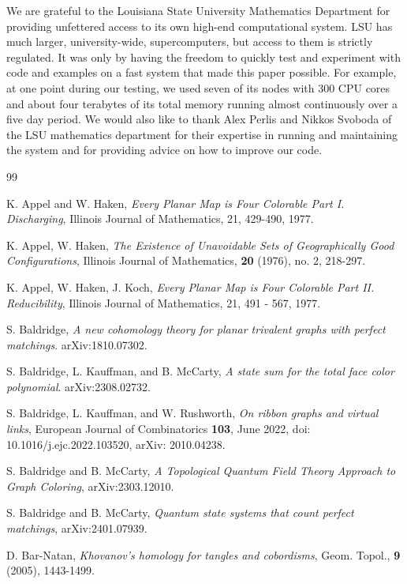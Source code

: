 \documentclass[12pt]{amsart}
\theoremstyle{definition}
\theoremstyle{remark}
\numberwithin{equation}{section}
\begin{document}
We are grateful to the Louisiana State University Mathematics Department for providing unfettered access to its own high-end computational system. LSU has much larger, university-wide, supercomputers, but access to them is strictly regulated. It was only by having the freedom to quickly test and experiment with code and examples on a fast system that made this paper possible. For example, at one point during our testing, we used seven of its nodes with 300 CPU cores and about four terabytes of its total memory running almost continuously over a five day period. We would also like to thank Alex Perlis and Nikkos Svoboda of the LSU mathematics department for their expertise in running and maintaining the system and for providing advice on how to improve our code. 


\begin{thebibliography}{99} \scriptsize

 K. Appel and W. Haken, {\em Every Planar Map is Four Colorable Part I. Discharging}, Illinois Journal of Mathematics, 21, 429-490, 1977.


 K. Appel, W. Haken, {\em The Existence of Unavoidable Sets of Geographically Good Configurations}, Illinois Journal of Mathematics, {\bf 20} (1976), no. 2, 218-297.

 K. Appel, W. Haken, J. Koch, {\em Every Planar Map is Four Colorable Part II. Reducibility}, Illinois Journal of Mathematics, 21,  491 - 567, 1977.

 S. Baldridge,  {\em A new cohomology theory for planar trivalent graphs with perfect matchings}.  	arXiv:1810.07302.

 S. Baldridge, L. Kauffman, and B. McCarty, {\em  A state sum for the total face color polynomial}. arXiv:2308.02732.

 S. Baldridge, L. Kauffman, and W. Rushworth, {\em On ribbon graphs and virtual links}, European Journal of Combinatorics {\bf 103}, June 2022, doi: 10.1016/j.ejc.2022.103520, arXiv: 2010.04238.

 S. Baldridge and B. McCarty, {\em A Topological Quantum Field Theory Approach to Graph Coloring}, arXiv:2303.12010.

 S. Baldridge and B. McCarty, {\em Quantum state systems that count perfect matchings}, arXiv:2401.07939.

 D. Bar-Natan, {\em Khovanov's homology for tangles and cobordisms}, 
Geom. Topol., {\bf 9} (2005), 1443-1499.


\end{thebibliography}
\end{document}
